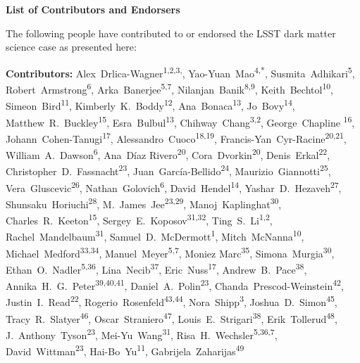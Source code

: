 
\begin{center}
  {\Large \bf List of Contributors and Endorsers}
\end{center}
\bigskip

The following people have contributed to or endorsed the LSST dark matter science case as presented here:

\def\altaffilmark#1{\textsuperscript{#1}}
\def\affil#1{\noindent #1 \\}

\normalsize
\begin{raggedright}
\textbf{Contributors:}
Alex~Drlica-Wagner\altaffilmark{1,2,3,\textdagger},
Yao-Yuan~Mao\altaffilmark{4,*},
Susmita~Adhikari\altaffilmark{5},
Robert~Armstrong\altaffilmark{6},
Arka~Banerjee\altaffilmark{5,7},
Nilanjan~Banik\altaffilmark{8,9},
Keith~Bechtol\altaffilmark{10},
Simeon~Bird\altaffilmark{11},
Kimberly~K.~Boddy\altaffilmark{12},
Ana~Bonaca\altaffilmark{13},
Jo~Bovy\altaffilmark{14},
Matthew~R.~Buckley\altaffilmark{15},
Esra~Bulbul\altaffilmark{13},
Chihway~Chang\altaffilmark{3,2},
George~Chapline \altaffilmark{16},
Johann~Cohen-Tanugi\altaffilmark{17},
Alessandro~Cuoco\altaffilmark{18,19},
Francis-Yan~Cyr-Racine\altaffilmark{20,21},
William~A.~Dawson\altaffilmark{6},
Ana~D\'{i}az Rivero\altaffilmark{20},
Cora~Dvorkin\altaffilmark{20},
Denis~Erkal\altaffilmark{22},
Christopher~D.~Fassnacht\altaffilmark{23},
Juan~Garc\'ia-Bellido\altaffilmark{24},
Maurizio~Giannotti\altaffilmark{25},
Vera~Gluscevic\altaffilmark{26},
Nathan~Golovich\altaffilmark{6},
David~Hendel\altaffilmark{14},
Yashar~D.~Hezaveh\altaffilmark{27},
Shunsaku~Horiuchi\altaffilmark{28},
M.~James~Jee\altaffilmark{23,29},
Manoj~Kaplinghat\altaffilmark{30},
Charles~R.~Keeton\altaffilmark{15},
Sergey~E.~Koposov\altaffilmark{31,32},
Ting~S.~Li\altaffilmark{1,2},
Rachel~Mandelbaum\altaffilmark{31},
Samuel~D.~McDermott\altaffilmark{1},
Mitch~McNanna\altaffilmark{10},
Michael~Medford\altaffilmark{33,34},
Manuel~Meyer\altaffilmark{5,7},
Moniez Marc\altaffilmark{35},
Simona~Murgia\altaffilmark{30},
Ethan~O.~Nadler\altaffilmark{5,36},
Lina~Necib\altaffilmark{37},
Eric~Nuss\altaffilmark{17},
Andrew~B.~Pace\altaffilmark{38},
Annika~H.~G.~Peter\altaffilmark{39,40,41},
Daniel~A.~Polin\altaffilmark{23},
Chanda~Prescod-Weinstein\altaffilmark{42},
Justin~I.~Read\altaffilmark{22},
Rogerio~Rosenfeld\altaffilmark{43,44},
Nora~Shipp\altaffilmark{3},
Joshua~D.~Simon\altaffilmark{45},
Tracy~R.~Slatyer\altaffilmark{46},
Oscar~Straniero\altaffilmark{47},
Louis~E.~Strigari\altaffilmark{38},
Erik~Tollerud\altaffilmark{48},
J.~Anthony~Tyson\altaffilmark{23},
Mei-Yu~Wang\altaffilmark{31},
Risa~H.~Wechsler\altaffilmark{5,36,7},
David~Wittman\altaffilmark{23},
Hai-Bo~Yu\altaffilmark{11},
Gabrijela~Zaharijas\altaffilmark{49}


\end{raggedright}
